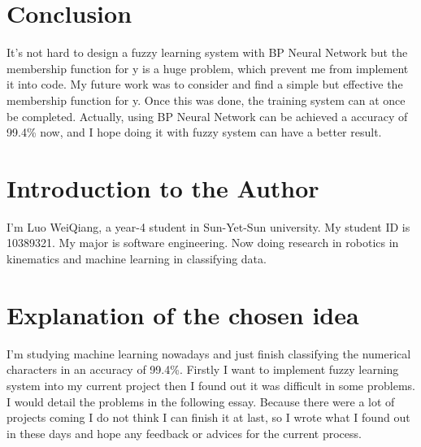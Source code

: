 \documentclass[12pt]{article} %
\begin{document}




\section{Conclusion} %

It's not hard to design a fuzzy learning system with BP Neural Network but the membership function for y is a huge problem, which prevent me from implement it into code. My future work was to consider and find a simple but effective the membership function for y. Once this was done, the training system can at once be completed. Actually, using BP Neural Network can be achieved a accuracy of 99.4\% now, and I hope doing it with fuzzy system can have a better result.


\newpage %

\section{Introduction to the Author}
I'm Luo WeiQiang, a year-4 student in Sun-Yet-Sun university. My student ID is 10389321. My major is software engineering. Now doing research in robotics in kinematics and machine learning in classifying data. 

\section{Explanation of the chosen idea}
I'm studying machine learning nowadays and just finish classifying the numerical characters in an accuracy of 99.4\%. Firstly I want to implement fuzzy learning system into my current project then I found out it was difficult in some problems. I would detail the problems in the following essay. Because there were a lot of projects coming I do not think I can finish it at last, so I wrote what I found out in these days and hope any feedback or advices for the current process. 
\end{document}
